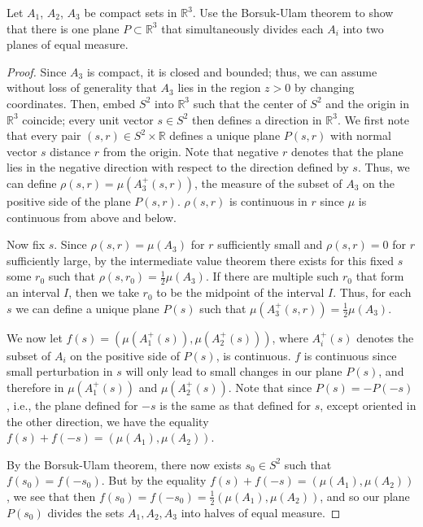\documentclass[12pt]{article}
\theoremstyle{remark}
\begin{document}
\begin{problem}
  Let $A_1$, $A_2$, $A_3$ be compact sets in $\mathbb{R}^3$. Use the Borsuk-Ulam theorem to show that there is one plane $P \subset \mathbb{R}^3$ that simultaneously divides each $A_i$ into two planes of equal measure.
\end{problem}
\begin{proof}
  Since $A_3$ is compact, it is closed and bounded; thus, we can assume without loss of generality that $A_3$ lies in the region $z > 0$ by changing coordinates. Then, embed $S^2$ into $\mathbb{R}^3$ such that the center of $S^2$ and the origin in $\mathbb{R}^3$ coincide; every unit vector $s \in S^2$ then defines a direction in $\mathbb{R}^3$. We first note that every pair $(s,r) \in S^2 \times \mathbb{R}$ defines a unique plane $P(s,r)$ with normal vector $s$ distance $r$ from the origin. Note that negative $r$ denotes that the plane lies in the negative direction with respect to the direction defined by $s$. Thus, we can define $\rho(s,r) = \mu(A_3^+(s,r))$, the measure of the subset of $A_3$ on the positive side of the plane $P(s,r)$. $\rho(s,r)$ is continuous in $r$ since $\mu$ is continuous from above and below.
  \par Now fix $s$. Since $\rho(s,r) = \mu(A_3)$ for $r$ sufficiently small and $\rho(s,r) = 0$ for $r$ sufficiently large, by the intermediate value theorem there exists for this fixed $s$ some $r_0$ such that $\rho(s,r_0) = \frac{1}{2} \mu(A_3)$. If there are multiple such $r_0$ that form an interval $I$, then we take $r_0$ to be the midpoint of the interval $I$. Thus, for each $s$ we can define a unique plane $P(s)$ such that $\mu(A_3^+(s,r)) = \frac{1}{2} \mu(A_3)$.
  \par We now let $f(s) = (\mu(A_1^+(s)),\mu(A_2^+(s)))$, where $A_i^+(s)$ denotes the subset of $A_i$ on the positive side of $P(s)$, is continuous. $f$ is continuous since small perturbation in $s$ will only lead to small changes in our plane $P(s)$, and therefore in $\mu(A_1^+(s))$ and $\mu(A_2^+(s))$. Note that since $P(s) = -P(-s)$, i.e., the plane defined for $-s$ is the same as that defined for $s$, except oriented in the other direction, we have the equality $f(s) + f(-s) = (\mu(A_1),\mu(A_2))$.
  \par By the Borsuk-Ulam theorem, there now exists $s_0 \in S^2$ such that $f(s_0) = f(-s_0)$. But by the equality $f(s) + f(-s) = (\mu(A_1),\mu(A_2))$, we see that then $f(s_0) = f(-s_0) = \frac{1}{2} (\mu(A_1),\mu(A_2))$, and so our plane $P(s_0)$ divides the sets $A_1,A_2,A_3$ into halves of equal measure.
\end{proof}
\end{document}
